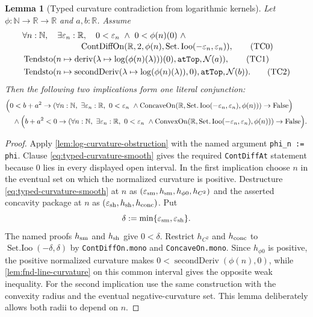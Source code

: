 \documentclass[9pt]{extarticle}
\newtheorem{lemma}{Lemma}[section]
\theoremstyle{definition}
\theoremstyle{remark}
\newcommand{\R}{\mathbb R}
\newcommand{\N}{\mathbb N}
\newcommand{\eps}{\varepsilon}
\begin{document}
\begin{lemma}[Typed curvature contradiction from logarithmic kernels]
\label{lem:typed-log-curvature-contradiction}
Let $\phi:\N\to\R\to\R$ and $a,b:\R$.  Assume
\begin{align*}
&\forall n:\N,\quad
 \exists\eps_n:\R,\quad 0<\eps_n\ \wedge\
 0<\phi(n)(0)\ \wedge\\[-2pt]
&\hspace{24mm}
 \operatorname{ContDiffOn}
  (\R,2,\phi(n),\operatorname{Set.Ioo}(-\eps_n,\eps_n)),
 \tag{TC0}\label{eq:typed-curvature-smooth}\\
&\operatorname{Tendsto}
 (n\mapsto\operatorname{deriv}
   (\lambda\mapsto\log(\phi(n)(\lambda)))(0),
  \texttt{atTop},\mathcal N(a)),\tag{TC1}\label{eq:typed-curvature-first}\\
&\operatorname{Tendsto}
 (n\mapsto\operatorname{secondDeriv}
   (\lambda\mapsto\log(\phi(n)(\lambda)),0),
  \texttt{atTop},\mathcal N(b)).\tag{TC2}\label{eq:typed-curvature-second}
\end{align*}
Then the following two implications form one literal conjunction:
\begin{align*}
&\Bigl(0<b+a^2\to
  (\forall n:\N,\ \exists\eps_n:\R,\ 0<\eps_n\ \wedge
   \operatorname{ConcaveOn}
    (\R,\operatorname{Set.Ioo}(-\eps_n,\eps_n),\phi(n)))
  \to\operatorname{False}\Bigr)\\
&\quad\wedge
\Bigl(b+a^2<0\to
  (\forall n:\N,\ \exists\eps_n:\R,\ 0<\eps_n\ \wedge
   \operatorname{ConvexOn}
    (\R,\operatorname{Set.Ioo}(-\eps_n,\eps_n),\phi(n)))
  \to\operatorname{False}\Bigr).
\end{align*}
\end{lemma}

\begin{proof}
Apply \cref{lem:log-curvature-obstruction} with the named argument
\texttt{phi\_n := phi}.  Clause \cref{eq:typed-curvature-smooth} gives the
required \texttt{ContDiffAt} statement because $0$ lies in every displayed
open interval.  In the first implication choose $n$ in the eventual set on
which the normalized curvature is positive.  Destructure
\cref{eq:typed-curvature-smooth} at $n$ as
$(\eps_{\rm sm},h_{\rm sm},h_{\phi0},h_{C^2})$ and the asserted concavity
package at $n$ as $(\eps_{\rm sh},h_{\rm sh},h_{\rm conc})$.  Put
\[
 \delta:=\min\{\eps_{\rm sm},\eps_{\rm sh}\}.
\]
The named proofs $h_{\rm sm}$ and $h_{\rm sh}$ give $0<\delta$.
Restrict $h_{C^2}$ and $h_{\rm conc}$ to
$\operatorname{Set.Ioo}(-\delta,\delta)$ by \texttt{ContDiffOn.mono} and
\texttt{ConcaveOn.mono}.  Since $h_{\phi0}$ is positive, the positive
normalized curvature makes
$0<\operatorname{secondDeriv}(\phi(n),0)$, while
\cref{lem:fnd-line-curvature} on this common interval gives the opposite
weak inequality.  For the second implication use the same construction
with the convexity radius and the eventual negative-curvature set.  This
lemma deliberately allows both radii to depend on $n$.
\end{proof}
\end{document}
